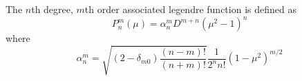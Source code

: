 \documentclass[12pt]{article}
\begin{document}


The $n$th degree, $m$th order associated legendre function is defined as
\begin{equation}
  P_n^m(\mu) = \alpha_n^mD^{m+n}(\mu^2-1)^n
\end{equation}
where
\begin{equation}
  \alpha_n^m = \sqrt{(2-\delta_{m0})\frac{(n-m)!}{(n+m)!}}\frac{1}{2^nn!}(1-\mu^2)^{m/2}
\end{equation}

\end{document}
